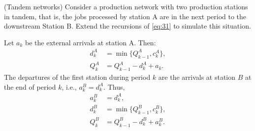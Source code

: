 \begin{question}(Tandem  networks) 
  Consider a production network with two production stations in
  tandem, that is, the jobs processed by station A are in the next
  period to the downstream Station B.  Extend the recursions of
  \eqref{eq:31} to simulate this situation.
\begin{solution}
  Let $a_k$ be the external arrivals at station A. Then:
\begin{equation}
  \begin{split}
    d^A_k &= \min\{Q_{k-1}^A, c_k^A\}, \\
    Q_k^A &= Q_{k-1}^A -d_k^A + a_k.
  \end{split}
\end{equation}
The departures of the first station during period $k$ are the arrivals
at station $B$ at the end of period $k$, i.e., $a_k^B =
d_{k}^A$. Thus,
\begin{equation}
  \begin{split}
    a_k^B &= d_{k}^A,\\
    d^B_k &= \min\{Q_{k-1}^B, c_k^B\}, \\
    Q_k^B &= Q_{k-1}^B -d_k^B + a_k^B.
  \end{split}
\end{equation}
\end{solution}
\end{question}

